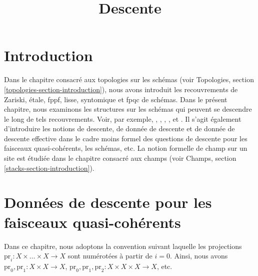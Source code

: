 

%


\title{Descente}

\maketitle

\label{section-phantom}

\tableofcontents

\section{Introduction}
\label{section-introduction}

\noindent
Dans le chapitre consacré aux topologies sur les schémas
(voir Topologies, section \ref{topologies-section-introduction}), nous avons
introduit les recouvrements de Zariski, \'etale, fppf, lisse, syntomique et
fpqc de schémas. Dans le présent chapitre, nous examinons les structures sur
les schémas qui peuvent se descendre le long de tels recouvrements. Voir, par
exemple, \cite{Gr-I}, \cite{Gr-II}, \cite{Gr-III}, \cite{Gr-IV}, \cite{Gr-V}
et \cite{Gr-VI}. Il s'agit également d'introduire les notions de descente, de
donnée de descente et de donnée de descente effective dans le cadre moins
formel des questions de descente pour les faisceaux quasi-cohérents, les
schémas, etc. La notion formelle de champ sur un site est étudiée dans le
chapitre consacré aux champs (voir Champs, section
\ref{stacks-section-introduction}).

\section{Données de descente pour les faisceaux quasi-cohérents}
\label{section-equivalence}

\noindent
Dans ce chapitre, nous adoptons la convention suivant laquelle les
projections $\text{pr}_i : X \times \ldots \times X \to X$ sont numérotées à
partir de $i = 0$. Ainsi, nous avons
$\text{pr}_0, \text{pr}_1 : X \times X  \to X$,
$\text{pr}_0, \text{pr}_1, \text{pr}_2 : X \times X \times X  \to X$, etc.


